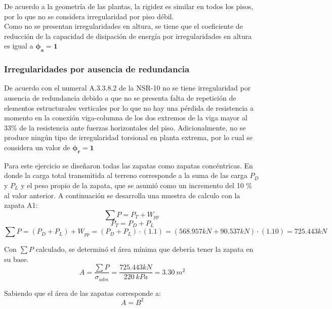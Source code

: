 \documentclass[12pt]{article}
\begin{document}
De acuerdo a la geometría de las plantas, la rigidez es similar en todos los pisos, por lo que no se considera irregularidad por piso débil.\\

Como no se presentan irregularidades en altura, se tiene que el coeficiente de reducción de la capacidad de disipación de energía por irregularidades en altura es igual a $\mathbf{\phi_{a}=1}$

\subsubsection{Irregularidades por ausencia de redundancia}


De acuerdo con el numeral A.3.3.8.2 de la NSR-10 no se tiene irregularidad por ausencia de redundancia debido a que no se presenta falta de repetición de elementos estructurales verticales por lo que no hay una pérdida de resistencia a momento en la conexión viga-columna de los dos extremos de la viga mayor al 33\% de la resistencia ante fuerzas horizontales del piso. Adicionalmente, no se produce ningún tipo de irregularidad torsional en planta extrema, por lo cual se considera un valor de $\mathbf{\phi_{r}=1}$

Para este ejercicio se diseñaron todas las zapatas como zapatas concéntricas. En donde la carga total transmitida al terreno corresponde a la suma de las carga $P_{D}$ y $P_{L}$ y el peso propio de la zapata, que se asumió como un incremento del 10 \% al valor anterior. A continuación se desarrolla una muestra de calculo con la zapata A1:
\begin{equation*}
    \sum P =P_{T}+W_{pp}
\end{equation*}
\begin{equation*}
    \ P_{T}=P_{D}+P_{L}
\end{equation*}
\begin{equation*}    
    \sum P =(P_{D}+P_{L})+W_{pp}=(P_{D}+P_{L})\cdot (1.1)=(568.957 kN+90.537 kN)\cdot (1.10)= 725.443 kN
\end{equation*}

Con $\sum P$ calculado, se determinó el área mínima que debería tener la zapata en su base.
\begin{equation*}
    \ A=\frac{\sum P}{\sigma_{adm}}=\frac{725.443 kN}{220~kPa}=3.30~m^2
\end{equation*}

Sabiendo que el área de las zapatas corresponde a:
\begin{equation*}
    \ A=B^2
\end{equation*}
\end{document}

